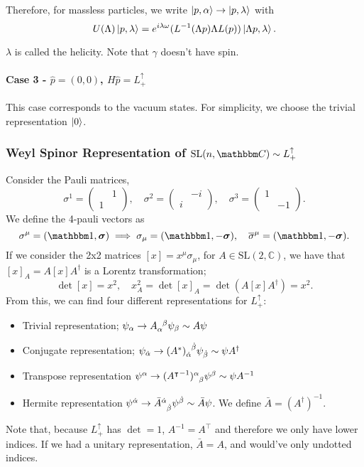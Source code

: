 \documentclass{article}
\begin{document}
Therefore, for massless particles, we write $\ket{p,\alpha}\to\ket{p,\lambda}$ with 
$$U(\Lambda)\ket{p,\lambda}=e^{i\lambda\omega}(L^{-1}(\Lambda p)\Lambda L(p))\ket{\Lambda p,\lambda}.$$

$\lambda$ is called the helicity. Note that $\gamma$ doesn't have spin.

\paragraph{Case 3 - $\hat p=(0,0)$, $H\hat p=L^\uparrow_+$}

This case corresponds to the vacuum states. For simplicity, we choose the trivial representation $\ket 0$.

\subsubsection{Weyl Spinor Representation of $\mathrm{SL}(n,\mathbbm C)\sim L^\uparrow_+$}

Consider the Pauli matrices,
$$\sigma^1=\begin{pmatrix}&1\\1&\end{pmatrix},\quad\sigma^2=\begin{pmatrix}&-i\\i&\end{pmatrix},\quad\sigma^3=\begin{pmatrix}1&\\&-1\end{pmatrix}.$$
We define the 4-pauli vectors as 
$$\sigma^\mu=(\mathbbm 1,\boldsymbol\sigma)\implies\sigma_\mu=(\mathbbm 1,-\boldsymbol\sigma),\quad\overline\sigma^\mu=(\mathbbm 1,-\boldsymbol\sigma).$$
If we consider the 2x2 matrices $[x]=x^\mu\sigma_\mu$, for $A\in\mathrm{SL}(2,\mathbb C)$, we have that $[x]_A=A[x]A^\dag$ is a Lorentz transformation; 
$$\det[x]=x^2,\quad x^2_A=\det[x]_A=\det(A[x]A^\dag)=x^2.$$
From this, we can find four different representations for $L^\uparrow_+$:
\begin{itemize}
    \item Trivial representation; $\psi_\alpha\to A\indices{_\alpha^\beta}\psi_\beta\sim A\psi$
    \item Conjugate representation; $\psi_{\dot\alpha}\to(A^*)\indices{_{\dot\alpha}^{\dot\beta}}\psi_{\dot\beta}\sim \psi A^\dag$
    \item Transpose representation $\psi^\alpha\to ({A^\intercal}^{-1})\indices{^\alpha_\beta}\psi^\beta\sim\psi A^{-1}$
    \item Hermite representation $\psi^{\dot\alpha}\to\bar A\indices{^{\dot\alpha}_{\dot\beta}}\psi^{\dot\beta}\sim\bar A\psi$. We define $\bar A=(A^\dag)^{-1}$.
\end{itemize}
Note that, because $L^\uparrow_+$ has $\det=1$, $A^{-1}=A^\intercal$ and therefore we only have lower indices. If we had a unitary representation, $\bar A=A$, and would've only undotted indices.
\end{document}
